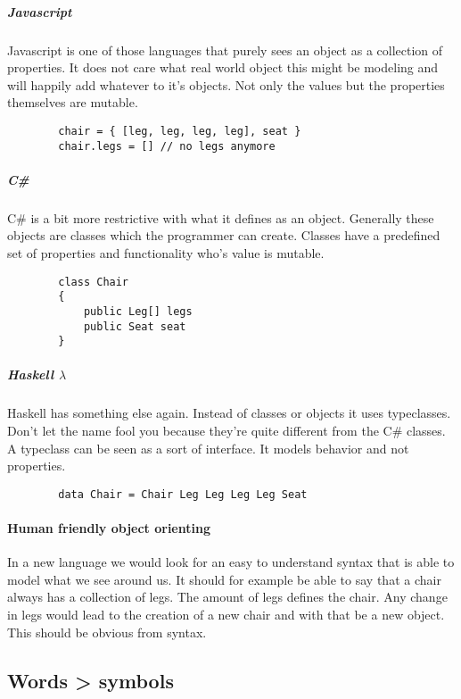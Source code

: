 \documentclass{scrartcl}
\begin{document}
    \subparagraph{Javascript}
    Javascript is one of those languages that purely sees an object as a
    collection of properties. It does not care what real world object 
    this might be modeling and will happily add whatever to it's objects.
    Not only the values but the properties themselves are mutable.
    \begin{lstlisting}
        chair = { [leg, leg, leg, leg], seat }
        chair.legs = [] // no legs anymore
    \end{lstlisting}

    \subparagraph{C\#}
    C\# is a bit more restrictive with what it defines as an object. Generally
    these objects are classes which the programmer can create. Classes have a
    predefined set of properties and functionality who's value is mutable.
    \begin{lstlisting}
        class Chair
        {
            public Leg[] legs
            public Seat seat
        }
    \end{lstlisting}
    
    \subparagraph{Haskell $\lambda$}
    Haskell has something else again. Instead of classes or objects it uses
    typeclasses. Don't let the name fool you because they're quite different from
    the C\# classes. A typeclass can be seen as a sort of interface. It models
    behavior and not properties.
    \begin{lstlisting}
        data Chair = Chair Leg Leg Leg Leg Seat
    \end{lstlisting}

    \paragraph{Human friendly object orienting}
    In a new language we would look for an easy to understand syntax that is
    able to model what we see around us. It should for example be able to
    say that a chair always has a collection of legs. The amount of legs
    defines the chair. Any change in legs would lead to the creation of a new
    chair and with that be a new object. This should be obvious from syntax.

    \subsection{Words > symbols}
\end{document}
